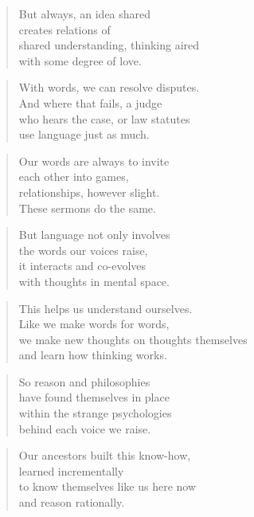 \documentclass[10pt,a4paper]{article}
\begin{document}
\begin{paracol}{2}
\begin{verse}
But always, an idea shared\\
creates relations of\\
shared understanding, thinking aired\\
with some degree of love.
\end{verse}

\begin{verse}
With words, we can resolve disputes.\\
And where that fails, a judge\\
who hears the case, or law statutes\\
use language just as much.
\end{verse}

\begin{verse}
Our words are always to invite\\
each other into games,\\
relationships, however slight.\\
These sermons do the same.
\end{verse}

\begin{verse}
But language not only involves\\
the words our voices raise,\\
it interacts and co-evolves\\
with thoughts in mental space.
\end{verse}

\begin{verse}
This helps us understand ourselves.\\
Like we make words for words,\\
we make new thoughts on thoughts themselves\\
and learn how thinking works.
\end{verse}

\begin{verse}
So reason and philosophies\\
have found themselves in place\\
within the strange psychologies\\
behind each voice we raise.
\end{verse}

\begin{verse}
Our ancestors built this know-how,\\
learned incrementally\\
to know themselves like us here now\\
and reason rationally.
\end{verse}


\end{paracol}
\end{document}

